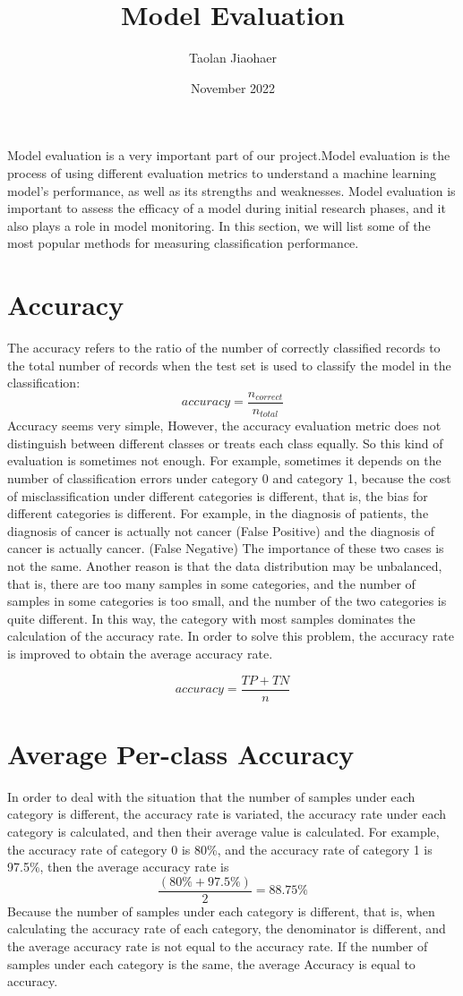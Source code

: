 \documentclass{article}
\title{Model Evaluation}
\author{Taolan Jiaohaer}
\date{November 2022}
\begin{document}
\maketitle
Model evaluation is a very important part of our project.Model evaluation is the process of using different evaluation metrics to understand a machine learning model’s performance, as well as its strengths and weaknesses. Model evaluation is important to assess the efficacy of a model during initial research phases, and it also plays a role in model monitoring. In this section, we will list some of the most popular methods for measuring classification performance.
\section{Accuracy}
The accuracy refers to the ratio of the number of correctly classified records to the total number of records when the test set is used to classify the model in the classification:
\[ accuracy = \frac{n_{correct}}{n_{total}} \]
Accuracy seems very simple, However, the accuracy evaluation metric does not distinguish between different classes or treats each class equally. So this kind of evaluation is sometimes not enough. For example, sometimes it depends on the number of classification errors under category 0 and category 1, because the cost of misclassification under different categories is different, that is, the bias for different categories is different. For example, in the diagnosis of patients, the diagnosis of cancer is actually not cancer (False Positive) and the diagnosis of cancer is actually cancer. (False Negative) The importance of these two cases is not the same. Another reason is that the data distribution may be unbalanced, that is, there are too many samples in some categories, and the number of samples in some categories is too small, and the number of the two categories is quite different. In this way, the category with most samples dominates the calculation of the accuracy rate. In order to solve this problem, the accuracy rate is improved to obtain the average accuracy rate.

\[accuracy = \frac{TP+TN}{n}\]

\section{Average Per-class Accuracy}
In order to deal with the situation that the number of samples under each category is different, the accuracy rate is variated, the accuracy rate under each category is calculated, and then their average value is calculated. For example, the accuracy rate of category 0 is 80\%, and the accuracy rate of category 1 is 97.5\%, then the average accuracy rate is \[\frac{(80\% + 97.5\%)}{2} = 88.75\%\]
Because the number of samples under each category is different, that is, when calculating the accuracy rate of each category, the denominator is different, and the average accuracy rate is not equal to the accuracy rate. If the number of samples under each category is the same, the average Accuracy is equal to accuracy.
\end{document}
